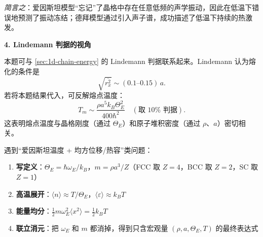 \begin{insightbox}[物理图像与概念串联]
\textit{简言之}：爱因斯坦模型``忘记''了晶格中存在任意低频的声学振动，因此在低温下错误地预测了振动冻结；德拜模型通过引入声子谱，成功描述了低温下持续的热激发。

\textbf{4. Lindemann 判据的视角}

本题可与 \ref{sec:1d-chain-energy} 的 Lindemann 判据联系起来。Lindemann 认为熔化的条件是
\begin{equation}
\sqrt{\overline{r_x^2}} \sim (0.1\text{--}0.15)\,a.
\end{equation}
若将本题结果代入，可反解熔点温度：
\begin{equation}
T_m \sim \frac{\rho a^5 k_B\Theta_E^2}{400\hbar^2} \quad (\text{取 }10\%\text{ 判据}).
\end{equation}
这表明熔点温度与晶格刚度（通过 $\Theta_E$）和原子堆积密度（通过 $\rho$、$a$）密切相关。
\end{insightbox}

\begin{thinkbox}
遇到``爱因斯坦温度 + 均方位移/热容''类问题：
\begin{enumerate}
    \item \textbf{写定义}：$\Theta_E=\hbar\omega_E/k_B$，$m=\rho a^3/Z$（FCC 取 $Z=4$，BCC 取 $Z=2$，SC 取 $Z=1$）
    \item \textbf{高温展开}：$\langle n\rangle\approx T/\Theta_E$，$\langle\varepsilon\rangle\approx k_BT$
    \item \textbf{能量均分}：$\frac12 m\omega_E^2\langle x^2\rangle = \frac12 k_BT$
    \item \textbf{联立消元}：把 $\omega_E$ 和 $m$ 都消掉，得到只含宏观量 $(\rho,a,\Theta_E,T)$ 的最终表达式
\end{enumerate}
\end{thinkbox}
